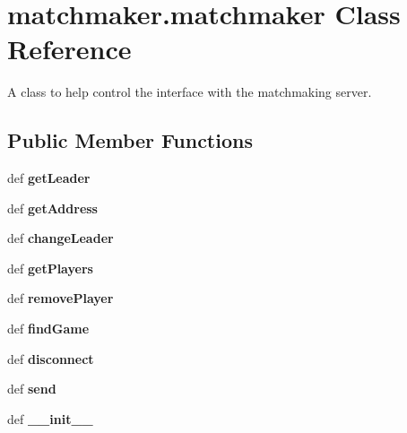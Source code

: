 \hypertarget{classmatchmaker_1_1matchmaker}{
\section{matchmaker.matchmaker Class Reference}
\label{classmatchmaker_1_1matchmaker}
}


A class to help control the interface with the matchmaking server.  


\subsection*{Public Member Functions}
\begin{DoxyCompactItemize}
\item 
\hypertarget{classmatchmaker_1_1matchmaker_a017b0f35ad0a8da8086c358065baa3c5}{
def {\bfseries getLeader}}
\label{classmatchmaker_1_1matchmaker_a017b0f35ad0a8da8086c358065baa3c5}

\item 
\hypertarget{classmatchmaker_1_1matchmaker_af0cd6e9e24ba9c585f1b78fd54e47c42}{
def {\bfseries getAddress}}
\label{classmatchmaker_1_1matchmaker_af0cd6e9e24ba9c585f1b78fd54e47c42}

\item 
\hypertarget{classmatchmaker_1_1matchmaker_ab999a3293f411a381f495e69f4a7d5db}{
def {\bfseries changeLeader}}
\label{classmatchmaker_1_1matchmaker_ab999a3293f411a381f495e69f4a7d5db}

\item 
\hypertarget{classmatchmaker_1_1matchmaker_a0b5d46bf083871dca363e8f2956df544}{
def {\bfseries getPlayers}}
\label{classmatchmaker_1_1matchmaker_a0b5d46bf083871dca363e8f2956df544}

\item 
\hypertarget{classmatchmaker_1_1matchmaker_acd185ab3af1a98514fae011a5014b346}{
def {\bfseries removePlayer}}
\label{classmatchmaker_1_1matchmaker_acd185ab3af1a98514fae011a5014b346}

\item 
\hypertarget{classmatchmaker_1_1matchmaker_a54cadf6af26eabccb1742133112ed564}{
def {\bfseries findGame}}
\label{classmatchmaker_1_1matchmaker_a54cadf6af26eabccb1742133112ed564}

\item 
\hypertarget{classmatchmaker_1_1matchmaker_a58bed0cff8c68842fe5ff695f27ecf22}{
def {\bfseries disconnect}}
\label{classmatchmaker_1_1matchmaker_a58bed0cff8c68842fe5ff695f27ecf22}

\item 
\hypertarget{classmatchmaker_1_1matchmaker_a0c70a06f9b28b89c1859be4e79e33d42}{
def {\bfseries send}}
\label{classmatchmaker_1_1matchmaker_a0c70a06f9b28b89c1859be4e79e33d42}

\item 
\hypertarget{classmatchmaker_1_1matchmaker_a1a06f166fb78519fbcef3e60a8aa4547}{
def {\bfseries \_\-\_\-init\_\-\_\-}}
\label{classmatchmaker_1_1matchmaker_a1a06f166fb78519fbcef3e60a8aa4547}

\end{DoxyCompactItemize}


